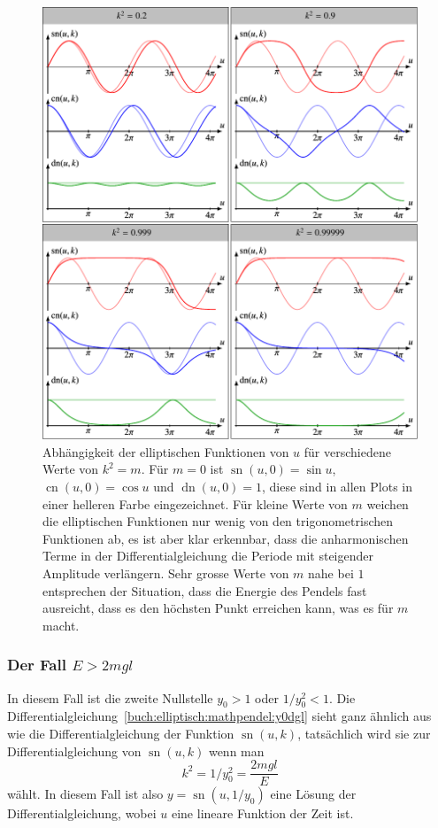\begin{figure}
\centering
\includegraphics[width=\textwidth]{chapters/110-elliptisch/images/jacobiplots.pdf}
\caption{%
Abhängigkeit der elliptischen Funktionen von $u$ für
verschiedene Werte von $k^2=m$.
Für $m=0$ ist $\operatorname{sn}(u,0)=\sin u$, 
$\operatorname{cn}(u,0)=\cos u$ und $\operatorname{dn}(u,0)=1$, diese
sind in allen Plots in einer helleren Farbe eingezeichnet.
Für kleine Werte von $m$ weichen die elliptischen Funktionen nur wenig
von den trigonometrischen Funktionen ab,
es ist aber klar erkennbar, dass die anharmonischen Terme in der
Differentialgleichung die Periode mit steigender Amplitude verlängern.
Sehr grosse Werte von $m$ nahe bei $1$ entsprechen der Situation, dass
die Energie des Pendels fast ausreicht, dass es den höchsten Punkt
erreichen kann, was es für $m$ macht.
\label{buch:elliptisch:fig:jacobiplots}}
\end{figure}

\subsubsection{Der Fall $E>2mgl$}
In diesem Fall ist die zweite Nullstelle $y_0>1$ oder $1/y_0^2 < 1$.
Die Differentialgleichung~\eqref{buch:elliptisch:mathpendel:y0dgl}
sieht ganz ähnlich aus wie die Differentialgleichung der
Funktion $\operatorname{sn}(u,k)$, tatsächlich wird sie zur
Differentialgleichung von $\operatorname{sn}(u,k)$ wenn man
\[
k^2
=
1/y_0^2
=
\frac{2mgl}{E}
\]
wählt.
In diesem Fall ist also $y=\operatorname{sn}(u,1/y_0)$ eine Lösung
der Differentialgleichung, wobei $u$ eine lineare Funktion der Zeit
ist.

